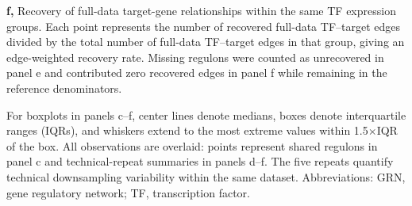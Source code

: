 \textbf{f,} Recovery of full-data target-gene relationships within the same TF expression groups. Each point represents the number of recovered full-data TF--target edges divided by the total number of full-data TF--target edges in that group, giving an edge-weighted recovery rate. Missing regulons were counted as unrecovered in panel e and contributed zero recovered edges in panel f while remaining in the reference denominators.

For boxplots in panels c--f, center lines denote medians, boxes denote interquartile ranges (IQRs), and whiskers extend to the most extreme values within 1.5\(\times\)IQR of the box. All observations are overlaid: points represent shared regulons in panel c and technical-repeat summaries in panels d--f. The five repeats quantify technical downsampling variability within the same dataset. Abbreviations: GRN, gene regulatory network; TF, transcription factor.
